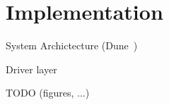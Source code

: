 
\section{Implementation}
\label{sec:impl}


%

\todo System Archictecture (Dune~\cite{belay2012dune})

\todo Driver layer

\todo TODO (figures, ...)
